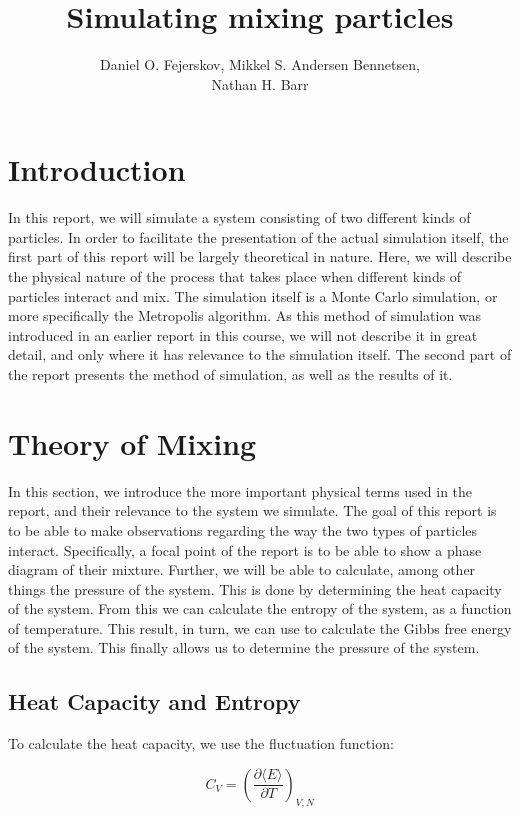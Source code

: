 \documentclass[12pt,a4paper]{report}
\begin{document}
\title{Simulating mixing particles}
\author{Daniel O. Fejerskov, Mikkel S. Andersen Bennetsen,\\ Nathan H. Barr}
\maketitle
\tableofcontents

\chapter{Introduction}
In this report, we will simulate a system consisting of two different kinds of particles. In order to facilitate the presentation of the actual simulation itself, the first part of this report will be largely theoretical in nature. Here, we will describe the physical nature of the process that takes place when different kinds of particles interact and mix. The simulation itself is a Monte Carlo simulation, or more specifically the Metropolis algorithm. As this method of simulation was introduced in an earlier report in this course, we will not describe it in great detail, and only where it has relevance to the simulation itself. The second part of the report presents the method of simulation, as well as the results of it.

\chapter{Theory of Mixing}
In this section, we introduce the more important physical terms used in the report, and their relevance to the system we simulate. The goal of this report is to be able to make observations regarding the way the two types of particles interact. Specifically, a focal point of the report is to be able to show a phase diagram of their mixture. Further, we will be able to calculate, among other things the pressure of the system. This is done by determining the heat capacity of the system. From this we can calculate the entropy of the system, as a function of temperature. This result, in turn, we can use to calculate the Gibbs free energy of the system. This finally allows us to determine the pressure of the system.

\section{Heat Capacity and Entropy}
To calculate the heat capacity, we use the fluctuation function:

\begin{equation}
C_V = \left( \frac{\partial \langle E \rangle}{\partial T} \right)_{V,N}
\end{equation}
\end{document}
